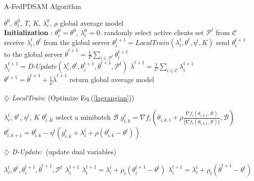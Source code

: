 \begin{algorithm}[H]
\small
	\renewcommand{\algorithmicrequire}{\textbf{Input:}}
	\renewcommand{\algorithmicensure}{\textbf{Output:}}
	\caption{A-FedPDSAM Algorithm}
    \begin{multicols}{2}
	\begin{algorithmic}[1]
		\REQUIRE $\theta^0$, $\theta_i^0$, $T$, $K$, $\lambda_i^0$, $\rho$
		\ENSURE global average model\\
            \STATE \textbf{Initialization} : $\theta_i^0=\theta^0$, $\lambda_i^0=0$.
            \STATE randomly select active clients set $\mathcal{P}^t$ from $\mathcal{C}$
            \STATE receive $\lambda_i^t, \theta^t$ from the global server
            \STATE $\theta_i^{t+1} = \textit{LocalTrain}(\lambda_i^t, \theta^t, \eta^t, K)$
            \STATE send $\theta_i^{t+1}$ to the global server 
            \ENDFOR
            \STATE $\overline{\theta}^{t+1} = \frac{1}{P}\sum_{i\in\mathcal{P}^t}\theta_i^{t+1}$
            \STATE $\lambda_i^{t+1}=\textit{D-Update}(\lambda_i^t, \theta^t, \theta_i^{t+1}, \overline{\theta}^{t+1}, \mathcal{P}^t)$
            \STATE $\overline{\lambda}^{t+1} = \frac{1}{C}\sum_{i\in\mathcal{C}}\lambda_i^{t+1}$
            \STATE $\theta^{t+1} = \overline{\theta}^{t+1} + \frac{1}{\rho} \overline{\lambda}^{t+1}$
            \ENDFOR
            \STATE return global average model
	\end{algorithmic}
    \textit{$\diamondsuit$ LocalTrain}: (Optimize Eq.(\ref{lagrangian}))
    \begin{algorithmic}[1]
	\REQUIRE $\lambda_i^t$, $\theta^t$, $\eta^t$, $K$
	\ENSURE $\theta_{i,K}^t$
        \STATE select a minibatch $\mathcal{B}$
        \STATE $g_{i,k}^t=\nabla f_i(\theta_{i,k,t} + \rho\frac{\nabla f_i(\theta_{i,k,t}, \mathcal{B})}{\Vert\nabla f_i(\theta_{i,k,t}, \mathcal{B})\Vert}, \mathcal{B})$
        \STATE $\theta_{i,k+1}^t = \theta_{i,k}^t - \eta^t(g_{i,k}^t + \lambda_i^t + \rho(\theta_{i,k}^t - \theta^t))$
        \ENDFOR
	\end{algorithmic}

    \textit{$\diamondsuit$ D-Update}:~(update dual variables)
    \begin{algorithmic}[1]
    \REQUIRE $\lambda_i^t, \theta^t, \theta_i^{t+1}, \overline{\theta}^{t+1}, \mathcal{P}^t$
	\ENSURE $\lambda_i^{t+1}$
    \STATE $\lambda_i^{t+1} = \lambda_i^{t} + \rho_t(\theta_i^{t+1} - \theta^t)$
    \ELSE 
    \STATE $\lambda_i^{t+1} = \lambda_i^{t} + \rho_t(\overline{\theta}^{t+1} - \theta^t)$
    \ENDIF
    \end{algorithmic}
\end{multicols}
\vspace{-0.3cm}
\end{algorithm}


